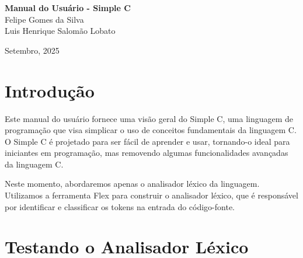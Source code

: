 \documentclass[12pt,a4paper]{article}
\begin{document}
\begin{titlepage}
	\begin{center}
	
	\vspace{115pt}
 \textbf{\Huge{Manual do Usuário - Simple C}}\\
  
	\vspace{115pt}
 Felipe Gomes da Silva \\
 Luis Henrique Salomão Lobato \\
	\end{center}
	
	\vspace{1cm}
	\begin{center}
		\vspace{\fill}
 \large{Setembro, 2025} 
	\end{center}
\end{titlepage}


\tableofcontents
\newpage
\section{Introdução}
\label{sec:intd}

Este manual do usuário fornece uma visão geral do Simple C, uma linguagem de programação que visa simplicar o uso de conceitos fundamentais da linguagem C. O Simple C é projetado para ser fácil de aprender e usar, tornando-o ideal para iniciantes em programação, mas removendo algumas funcionalidades avançadas da linguagem C. 

Neste momento, abordaremos apenas o analisador léxico da linguagem. Utilizamos a ferramenta Flex para construir o analisador léxico, que é responsável por identificar e classificar os tokens na entrada do código-fonte.

\section{Testando o Analisador Léxico}
\label{sec:test}
\end{document}
